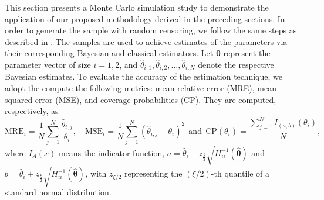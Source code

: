 \documentclass[12pt]{article} %
\theoremstyle{plain}%
\theoremstyle{definition}
\theoremstyle{remark}
\begin{document}
This section presents a Monte Carlo simulation study to demonstrate the application of our proposed methodology derived in the preceding sections. In order to generate the sample with random censoring, we follow the same steps as described in  \cite{ramos2020sampling}. The samples are used to achieve estimates of the parameters via their corresponding Bayesian and classical estimators. Let $\boldsymbol\theta$ represent the parameter vector of size $i=1,2$, and $\hat\theta_{i,1},\hat\theta_{i,2},\ldots,\hat\theta_{i,N}$ denote the respective Bayesian estimates. To evaluate the accuracy of the estimation technique, we adopt the compute the following metrics: mean relative error (MRE), mean squared error (MSE), and coverage probabilities (CP). They are computed, respectively, as
\begin{equation*}%
\text{MRE}_i=\dfrac{1}{N}\sum_{j=1}^{N}\frac{\hat\theta_{i,j}}{\theta_i}, \quad \text{MSE}_i=\dfrac{1}{N}\sum_{j=1}^{N}\left(\hat\theta_{i,j}-\theta_i\right)^2  \ \ \text{and}  \ \ \text{CP}(\theta_i)=\dfrac{\sum_{j=1}^{N} I_{(a,b)}\left(\theta_i\right)}{N}, 
\end{equation*}
where $I_{A}(x)$ means the indicator function, $a=\hat{\theta}_i - z_{\frac{\xi}{2}}\sqrt{H^{-1}_{ii}(\hat{\boldsymbol{\theta}})}$ and $b=\hat{\theta}_i + z_{\frac{\xi}{2}}\sqrt{H^{-1}_{ii}(\hat{\boldsymbol{\theta}})}$, with $z_{\xi/2}$ representing the $\left(\xi/2\right)$-th quantile of a standard normal distribution. 
\end{document}
